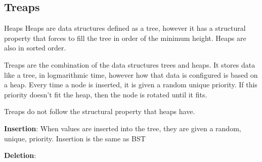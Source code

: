 \subsection{Treaps}
\begin{definition}{Heaps}{}
    Heaps are data structures defined as a tree, however it has a structural property that forces to fill the tree in order of the minimum height. Heaps are also in sorted order.
\end{definition}
Treaps are the combination of the data structures trees and heaps. It stores data like a tree, in logmarithmic time, however how that data is configured is based on a heap. Every time a node is inserted, it is given a random unique priority. If this priority doesn't fit the heap, then the node is rotated until it fits.
\begin{note}
    Treaps do not follow the structural property that heaps have.
\end{note}
\textbf{Insertion}:
When values are inserted into the tree, they are given a random, unique, priority. Insertion is the same as BST
\par
\textbf{Deletion}: